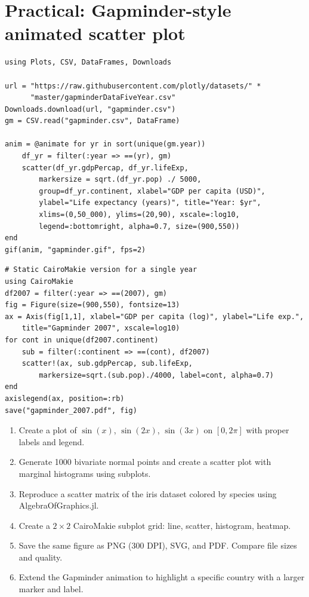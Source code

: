 \section{Practical: Gapminder-style animated scatter plot}

\begin{verbatim}
using Plots, CSV, DataFrames, Downloads

url = "https://raw.githubusercontent.com/plotly/datasets/" *
      "master/gapminderDataFiveYear.csv"
Downloads.download(url, "gapminder.csv")
gm = CSV.read("gapminder.csv", DataFrame)

anim = @animate for yr in sort(unique(gm.year))
    df_yr = filter(:year => ==(yr), gm)
    scatter(df_yr.gdpPercap, df_yr.lifeExp,
        markersize = sqrt.(df_yr.pop) ./ 5000,
        group=df_yr.continent, xlabel="GDP per capita (USD)",
        ylabel="Life expectancy (years)", title="Year: $yr",
        xlims=(0,50_000), ylims=(20,90), xscale=:log10,
        legend=:bottomright, alpha=0.7, size=(900,550))
end
gif(anim, "gapminder.gif", fps=2)
\end{verbatim}

\begin{verbatim}
# Static CairoMakie version for a single year
using CairoMakie
df2007 = filter(:year => ==(2007), gm)
fig = Figure(size=(900,550), fontsize=13)
ax = Axis(fig[1,1], xlabel="GDP per capita (log)", ylabel="Life exp.",
    title="Gapminder 2007", xscale=log10)
for cont in unique(df2007.continent)
    sub = filter(:continent => ==(cont), df2007)
    scatter!(ax, sub.gdpPercap, sub.lifeExp,
        markersize=sqrt.(sub.pop)./4000, label=cont, alpha=0.7)
end
axislegend(ax, position=:rb)
save("gapminder_2007.pdf", fig)
\end{verbatim}

\begin{exercise}
\begin{enumerate}
  \item Create a plot of $\sin(x)$, $\sin(2x)$, $\sin(3x)$ on $[0, 2\pi]$ with proper labels and legend.
  \item Generate 1000 bivariate normal points and create a scatter plot with marginal histograms using subplots.
  \item Reproduce a scatter matrix of the iris dataset colored by species using AlgebraOfGraphics.jl.
  \item Create a $2 \times 2$ CairoMakie subplot grid: line, scatter, histogram, heatmap.
  \item Save the same figure as PNG (300 DPI), SVG, and PDF. Compare file sizes and quality.
  \item Extend the Gapminder animation to highlight a specific country with a larger marker and label.
\end{enumerate}
\end{exercise}

